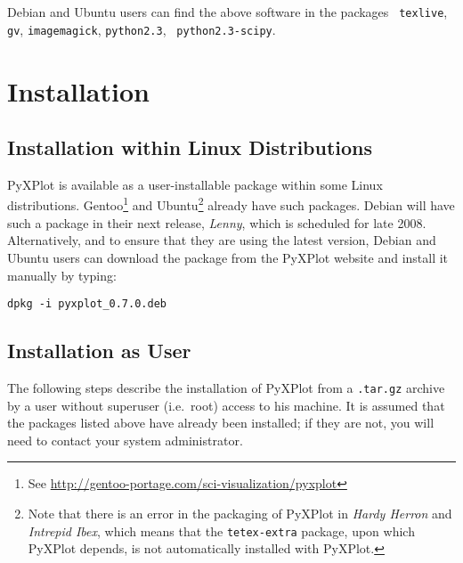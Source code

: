 Debian and Ubuntu users can find the above software in the packages {\tt
texlive}, {\tt gv}, {\tt imagemagick}, {\tt python2.3}, {\tt
python2.3-scipy}.

\section{Installation}

\subsection{Installation within Linux Distributions}

PyXPlot is available as a user-installable package within some Linux
distributions. Gentoo\footnote{See \url{http://gentoo-portage.com/sci-visualization/pyxplot}}
and Ubuntu\footnote{Note
that there is an error in the packaging of PyXPlot in {\it Hardy Herron} and
{\it Intrepid Ibex}, which means that the {\tt tetex-extra} package, upon which
PyXPlot depends, is not automatically installed with PyXPlot.} already have
such packages. Debian will have such a package in their next release, {\it
Lenny}, which is scheduled for late 2008. Alternatively, and to ensure that
they are using the latest version, Debian and Ubuntu users can download the
package from the PyXPlot website and install it manually by typing:

\begin{verbatim}
dpkg -i pyxplot_0.7.0.deb
\end{verbatim}

\subsection{Installation as User}

The following steps describe the installation of PyXPlot from a {\tt .tar.gz}
archive by a user without superuser (i.e.\ root) access to his machine. It is
assumed that the packages listed above have already been installed; if they are
not, you will need to contact your system
administrator.

